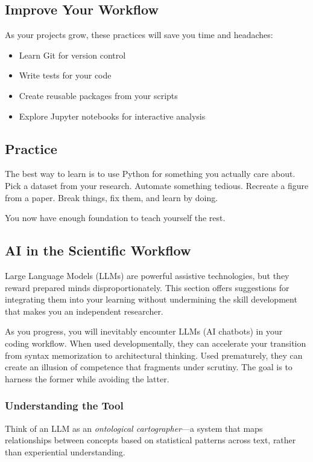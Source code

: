 \subsection{Improve Your Workflow}

As your projects grow, these practices will save you time and headaches:
\begin{itemize}
    \item Learn Git for version control
    \item Write tests for your code
    \item Create reusable packages from your scripts
    \item Explore Jupyter notebooks for interactive analysis
\end{itemize}

\subsection{Practice}

The best way to learn is to use Python for something you actually care about. Pick a dataset from your research. Automate something tedious. Recreate a figure from a paper. Break things, fix them, and learn by doing.

You now have enough foundation to teach yourself the rest.

\subsection{AI in the Scientific Workflow}
\label{sec:ai-usage}

\begin{note}
    Large Language Models (LLMs) are powerful assistive technologies, but they reward prepared minds disproportionately. This section offers suggestions for integrating them into your learning without undermining the skill development that makes you an independent researcher.
\end{note}

\noindent As you progress, you will inevitably encounter LLMs (AI chatbots) in your coding workflow. When used developmentally, they can accelerate your transition from syntax memorization to architectural thinking. Used prematurely, they can create an illusion of competence that fragments under scrutiny. The goal is to harness the former while avoiding the latter.

\subsubsection*{Understanding the Tool}
Think of an LLM as an \textit{ontological cartographer}---a system that maps relationships between concepts based on statistical patterns across text, rather than experiential understanding. 

